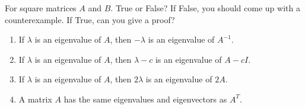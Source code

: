 \documentclass{ximera}
\author{}
\begin{document}
\begin{exercise}

For square matrices $A$ and $B$.  True or False?  If False, you should come up with a counterexample.  If True, can you give a proof?

 \begin{enumerate}
 
\item If $\lambda$ is an eigenvalue of $A$, then $-\lambda$ is an eigenvalue of $A^{-1}$.
 \begin{multipleChoice}
 \end{multipleChoice}

 \item If $\lambda$ is an eigenvalue of $A$, then $\lambda - c$ is an eigenvalue of $A - cI$.
 \begin{multipleChoice}
 \end{multipleChoice}

 \item If $\lambda$ is an eigenvalue of $A$, then $2\lambda$ is an eigenvalue of $2A$.
 \begin{multipleChoice}
 \end{multipleChoice}

 \item A matrix $A$ has the same eigenvalues and eigenvectors as $A^T$.
 \begin{multipleChoice}
 \end{multipleChoice}


 \end{enumerate}

 
\end{exercise}
\end{document}
